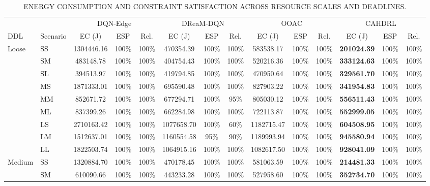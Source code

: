 \documentclass[journal]{IEEEtran}
\begin{document}
\begin{table}[!t]
\centering
\caption{ENERGY CONSUMPTION AND CONSTRAINT SATISFACTION ACROSS RESOURCE SCALES AND DEADLINES.}
\label{tab:constraint_results}
\scriptsize
\setlength{\tabcolsep}{3pt}
\renewcommand{\arraystretch}{1.05}
\begin{tabular*}{\textwidth}{@{\extracolsep{\fill}}ll*{4}{ccc}@{}}
\toprule
& & \multicolumn{3}{c}{DQN-Edge}
& \multicolumn{3}{c}{DReaM-DQN}
& \multicolumn{3}{c}{OOAC}
& \multicolumn{3}{c}{CAHDRL} \\
\cmidrule(lr){3-5}
\cmidrule(lr){6-8}
\cmidrule(lr){9-11}
\cmidrule(l){12-14}
DDL & Scenario
& EC (J) & ESP & Rel.
& EC (J) & ESP & Rel.
& EC (J) & ESP & Rel.
& EC (J) & ESP & Rel. \\
\midrule
Loose & SS & 1304446.16 & 100\% & 100\% & 470354.39 & 100\% & 100\% & 583538.17 & 100\% & 100\% & \textbf{201024.39} & 100\% & 100\% \\
 & SM & 483148.78 & 100\% & 100\% & 404754.43 & 100\% & 100\% & 520216.36 & 100\% & 100\% & \textbf{333124.63} & 100\% & 100\% \\
 & SL & 394513.97 & 100\% & 100\% & 419794.85 & 100\% & 100\% & 470950.64 & 100\% & 100\% & \textbf{329561.70} & 100\% & 100\% \\
 & MS & 1871333.01 & 100\% & 100\% & 695590.48 & 100\% & 100\% & 827903.22 & 100\% & 100\% & \textbf{341954.83} & 100\% & 100\% \\
 & MM & 852671.72 & 100\% & 100\% & 677294.71 & 100\% & 95\% & 805030.12 & 100\% & 100\% & \textbf{556511.43} & 100\% & 100\% \\
 & ML & 837399.26 & 100\% & 100\% & 662284.98 & 100\% & 100\% & 722113.87 & 100\% & 100\% & \textbf{552999.05} & 100\% & 100\% \\
 & LS & 2710163.42 & 100\% & 100\% & 1077658.70 & 100\% & 60\% & 1182715.47 & 100\% & 100\% & \textbf{604508.95} & 100\% & 100\% \\
 & LM & 1512637.01 & 100\% & 100\% & 1160554.58 & 95\% & 90\% & 1189993.94 & 100\% & 100\% & \textbf{945580.94} & 100\% & 100\% \\
 & LL & 1822503.74 & 100\% & 100\% & 1064915.16 & 100\% & 100\% & 1082617.50 & 100\% & 100\% & \textbf{928041.09} & 100\% & 100\% \\
\midrule
Medium & SS & 1320884.70 & 100\% & 100\% & 470178.45 & 100\% & 100\% & 581063.59 & 100\% & 100\% & \textbf{214481.33} & 100\% & 100\% \\
 & SM & 610090.66 & 100\% & 100\% & 443233.28 & 100\% & 100\% & 527958.60 & 100\% & 100\% & \textbf{352734.70} & 100\% & 100\% \\

\end{tabular*}
\end{table}
\end{document}
